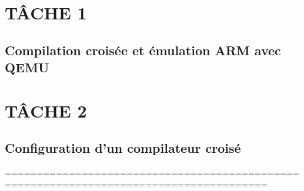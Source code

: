 \usepackage{lipsum}



\coverpage{\TITLE}{\SUBTITLE}{\AUTHOR}{\DATE}
\newpage
\tableofcontents

\part{TÂCHE 1}
\newpage
\chapter{ Compilation croisée et émulation ARM avec QEMU} \label{Compilation croisée et émulation ARM avec QEMU}




\part{TÂCHE 2}
\chapter{ Configuration d'un compilateur croisé } \label{ configuration d'un compilateur croisé en utilisant Crosstool-NG}


=======================================================================================


